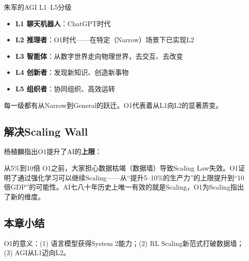 \begin{knowledgebox}{朱军的AGI L1--L5分级}
\begin{itemize}
\item \textbf{L1 聊天机器人}：ChatGPT时代
\item \textbf{L2 推理者}：O1时代——在特定（Narrow）场景下已实现L2
\item \textbf{L3 智能体}：从数字世界走向物理世界，去交互、去改变
\item \textbf{L4 创新者}：发现新知识、创造新事物
\item \textbf{L5 组织者}：协同组织、高效运转
\end{itemize}
每一级都有从Narrow到General的跃迁。O1代表着从L1向L2的显著质变。
\end{knowledgebox}

\subsection{解决Scaling Wall}

杨植麟指出O1提升了AI的\textbf{上限}：

\begin{importantbox}{从5\%到10倍}
O1之前，大家担心数据枯竭（数据墙）导致Scaling Law失效。O1证明了通过强化学习可以继续Scaling——从``提升5--10\%的生产力''的上限提升到``10倍GDP''的可能性。AI七八十年历史上唯一有效的就是Scaling，O1为Scaling指出了新的维度。
\end{importantbox}

\subsection{本章小结}

O1的意义：(1) 语言模型获得System 2能力；(2) RL Scaling新范式打破数据墙；(3) AGI从L1迈向L2。


